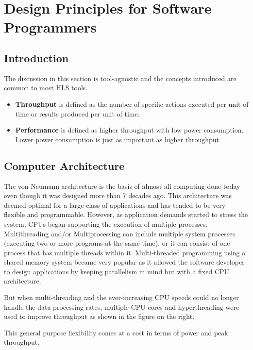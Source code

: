 
\section{Design Principles for Software Programmers}

\subsection{Introduction}
The discussion in this section is tool-agnostic and the concepts introduced are common to most HLS tools. 

\begin{itemize}
  \item \textbf{Throughput} is defined as the number of specific actions executed per unit of time or results produced per unit of time.
  \item \textbf{Performance} is defined as higher throughput with low
  power consumption. Lower power consumption is just as important as higher throughput.
  
\end{itemize}


\subsection{Computer Architecture}

The von Neumann architecture is the basis of almost all computing done today even though it was designed more than 7 decades ago. This architecture was deemed optimal for a large class of
applications and has tended to be very flexible and programmable. 
However, as application demands started to stress the system, CPUs began supporting the execution of multiple
processes. Multithreading and/or Multiprocessing can include multiple system processes (\eg executing two or more programs at the same time), or it can consist of one process that
has multiple threads within it. Multi-threaded programming using a shared memory system
became very popular as it allowed the software developer to design applications by keeping parallelism in mind but with a fixed CPU architecture. 

\par But when multi-threading and the ever-increasing CPU speeds could no longer handle the data processing rates, multiple CPU cores and hyperthreading were used to improve throughput as shown in the figure on the right.

\begin{highlight}
  This general purpose flexibility comes at a cost in terms of power and peak throughput.  
\end{highlight}

